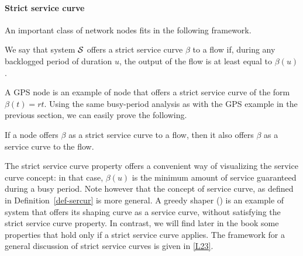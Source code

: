 
\paragraph{Strict service curve}
An important class of network nodes fits in the following
framework.
\begin{definition}
 We say that system $\mathcal S$ offers a strict
service curve $\beta$ to a flow if, during any backlogged period
of duration $u$, the output of the flow is at least equal to
$\beta(u)$.
\end{definition}%
 A GPS node is an example of node that
offers a strict service curve of the form $\beta(t)=rt$. Using the
same busy-period analysis as with the GPS example in the previous
section, we can easily prove the following.
\begin{proposition}
If a node offers $\beta$ as a strict service curve to a flow, then
it also offers $\beta$ as a service curve to the flow.
\end{proposition}

The strict service curve property offers a convenient way of
visualizing the service curve concept: in that case, $\beta(u)$ is
the minimum amount of service guaranteed during a busy period.
Note however that the concept of service curve, as defined in
Definition~\ref{def-sercur} is more general. A greedy shaper
() is an example of system that offers its shaping
curve as a service curve, without satisfying the strict service
curve property. In contrast, we will find later in the book some
properties that hold only if a strict service curve applies. The
framework for a general discussion of strict service curves is
given in \cref{L23}.

